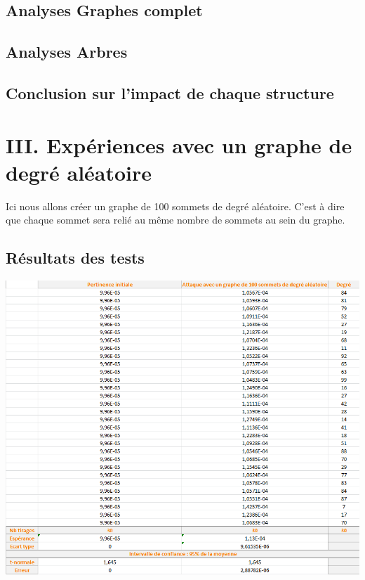 \documentclass[a4paper,11pt]{article}
\begin{document}
	\subsection{Analyses Graphes complet}
		

	\subsection{Analyses Arbres}
		

	\subsection{Conclusion sur l'impact de chaque structure}


\section{III.	Expériences avec un graphe de degré aléatoire}
	Ici nous allons créer un graphe de 100 sommets de degré aléatoire. C'est à dire que chaque sommet sera relié au même nombre de sommets au sein du graphe.
	
	\subsection{Résultats des tests}
		\includegraphics[scale = 0.5]{Captures/ranking4.PNG}\\
		
	
\end{document}
